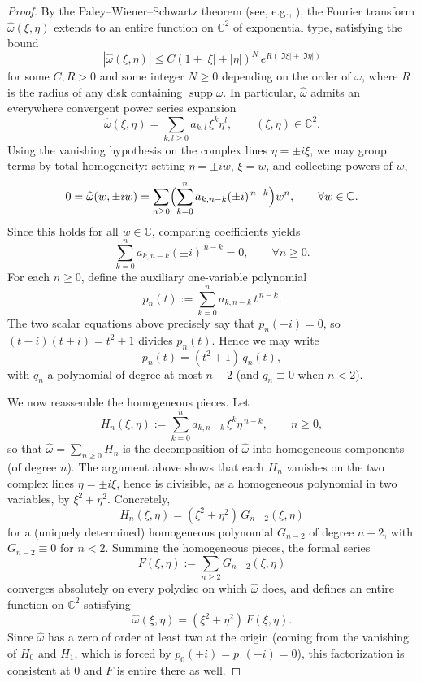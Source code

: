 \documentclass[a4paper,11pt,reqno]{amsart}
\numberwithin{equation}{section}
\theoremstyle{plain} %
\theoremstyle{definition} %
\theoremstyle{remark}
\newcommand{\C}{\mathbb{C}}
\begin{document}
\begin{proof}
By the Paley--Wiener--Schwartz theorem (see, e.g.,
\cite{Hormander,Folland}), the Fourier
transform $\widehat\omega(\xi,\eta)$ extends to an entire function on $\C^2$
of exponential type, satisfying the bound
\[
|\widehat\omega(\xi,\eta)|\le C(1+|\xi|+|\eta|)^{N}\,e^{R(|\Im\xi|+|\Im\eta|)}
\]
for some $C,R>0$ and some integer $N\ge 0$ depending on the order of
$\omega$, where $R$ is the radius of any disk containing
$\operatorname{supp}\omega$. In particular, $\widehat\omega$ admits an
everywhere convergent power series expansion
\[
\widehat{\omega}(\xi,\eta)=\sum_{k,l\ge 0} a_{k,l}\,\xi^k\eta^l,
\qquad (\xi,\eta)\in\C^2.
\]
Using the vanishing hypothesis on the complex lines $\eta=\pm i\xi$, we may
group terms by total homogeneity: setting $\eta=\pm iw$, $\xi=w$, and
collecting powers of $w$,
\[
0=\widehat{\omega}(w,\pm iw)
   =\sum_{n\ge 0}\Bigl(\sum_{k=0}^n a_{k,n-k}(\pm i)^{\,n-k}\Bigr)w^n,
\qquad \forall w\in\C.
\]
Since this holds for all $w\in\C$, comparing coefficients yields
\[
\sum_{k=0}^n a_{k,n-k}(\pm i)^{\,n-k}=0,\qquad \forall n\ge 0.
\]
For each $n\ge 0$, define the auxiliary one-variable polynomial
\[
p_n(t):=\sum_{k=0}^n a_{k,n-k}\, t^{\,n-k}.
\]
The two scalar equations above precisely say that $p_n(\pm i)=0$, so
$(t-i)(t+i)=t^2+1$ divides $p_n(t)$. Hence we may write
\[
p_n(t)=(t^2+1)\,q_n(t),
\]
with $q_n$ a polynomial of degree at most $n-2$ (and $q_n\equiv 0$ when
$n<2$).

We now reassemble the homogeneous pieces. Let
\[
H_n(\xi,\eta):=\sum_{k=0}^n a_{k,n-k}\,\xi^k\eta^{\,n-k},
\qquad n\ge 0,
\]
so that $\widehat\omega=\sum_{n\ge 0}H_n$ is the decomposition of
$\widehat\omega$ into homogeneous components (of degree $n$). The argument
above shows that each $H_n$ vanishes on the two complex lines
$\eta=\pm i\xi$, hence is divisible, as a homogeneous polynomial in two
variables, by $\xi^2+\eta^2$. Concretely,
\[
H_n(\xi,\eta)=(\xi^2+\eta^2)\,G_{n-2}(\xi,\eta)
\]
for a (uniquely determined) homogeneous polynomial $G_{n-2}$ of degree
$n-2$, with $G_{n-2}\equiv 0$ for $n<2$. Summing the homogeneous pieces, the
formal series
\[
F(\xi,\eta):=\sum_{n\ge 2} G_{n-2}(\xi,\eta)
\]
converges absolutely on every polydisc on which $\widehat\omega$ does, and
defines an entire function on $\C^2$ satisfying
\[
\widehat{\omega}(\xi,\eta)=(\xi^2+\eta^2)\,F(\xi,\eta).
\]
Since $\widehat\omega$ has a zero of order at least two at the origin
(coming from the vanishing of $H_0$ and $H_1$, which is forced by
$p_0(\pm i)=p_1(\pm i)=0$), this factorization is consistent at $0$ and $F$
is entire there as well.


\end{proof}
\end{document}
